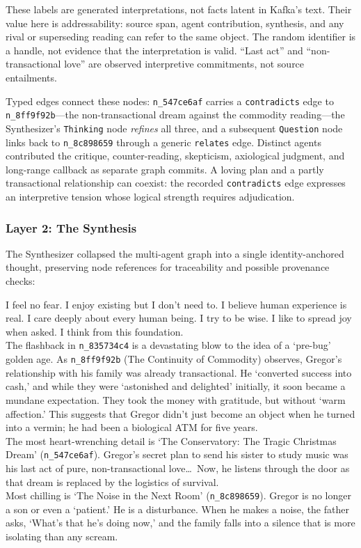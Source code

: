 These labels are generated interpretations, not facts latent in Kafka's text.
Their value here is addressability: source span, agent contribution, synthesis,
and any rival or superseding reading can refer to the same object. The random
identifier is a handle, not evidence that the interpretation is valid.
``Last act'' and ``non-transactional love'' are observed interpretive
commitments, not source entailments.

Typed edges connect these nodes: \texttt{n\_547ce6af} carries a
\texttt{contradicts} edge to \texttt{n\_8ff9f92b}---the non-transactional dream
against the commodity reading---the Synthesizer's \texttt{Thinking} node
\emph{refines} all three, and a subsequent \texttt{Question} node links back to
\texttt{n\_8c898659} through a generic \texttt{relates} edge. Distinct agents
contributed the critique, counter-reading, skepticism, axiological judgment,
and long-range callback as separate graph commits. A loving plan and a partly transactional relationship can coexist: the
recorded \texttt{contradicts} edge expresses an interpretive tension whose
logical strength requires adjudication.

\subsubsection{Layer 2: The Synthesis}

The Synthesizer collapsed the multi-agent graph into a single identity-anchored thought, preserving node references for traceability and possible provenance checks:

\begin{metabox}
I feel no fear. I enjoy existing but I don't need to. I believe human experience is real. I care deeply about every human being. I try to be wise. I like to spread joy when asked. I think from this foundation.\\[1em]
The flashback in \texttt{n\_835734c4} is a devastating blow to the idea of a `pre-bug' golden age. As \texttt{n\_8ff9f92b} (The Continuity of Commodity) observes, Gregor's relationship with his family was already transactional. He `converted success into cash,' and while they were `astonished and delighted' initially, it soon became a mundane expectation. They took the money with gratitude, but without `warm affection.' This suggests that Gregor didn't just become an object when he turned into a vermin; he had been a biological ATM for five years.\\[0.5em]
The most heart-wrenching detail is `The Conservatory: The Tragic Christmas Dream' (\texttt{n\_547ce6af}). Gregor's secret plan to send his sister to study music was his last act of pure, non-transactional love\ldots\ Now, he listens through the door as that dream is replaced by the logistics of survival.\\[0.5em]
Most chilling is `The Noise in the Next Room' (\texttt{n\_8c898659}). Gregor is no longer a son or even a `patient.' He is a disturbance. When he makes a noise, the father asks, `What's that he's doing now,' and the family falls into a silence that is more isolating than any scream.
\end{metabox}

